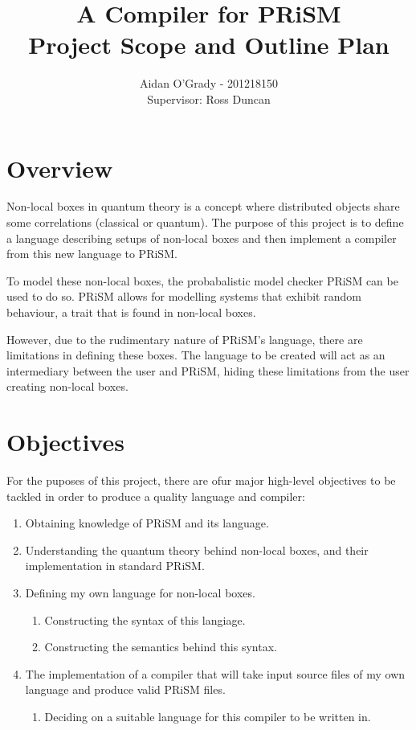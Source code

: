 \documentclass[12pt, a4paper]{article}
\begin{document}
\title{A Compiler for PRiSM \\
\large{Project Scope and Outline Plan}}
\author{Aidan O'Grady - 201218150\\{Supervisor: Ross Duncan}}
\date{}
\maketitle
\newpage

\section{Overview} %
\label{sec:overview}
Non-local boxes in quantum theory is a concept where distributed objects share
some correlations (classical or quantum). The purpose of this project is to
define a language describing setups of non-local boxes and then implement a
compiler from this new language to PRiSM.

To model these non-local boxes, the probabalistic model checker PRiSM can be
used to do so. PRiSM allows for modelling systems that exhibit random behaviour,
a trait that is found in non-local boxes.

However, due to the rudimentary nature of PRiSM's language, there are
limitations in defining these boxes. The language to be created will act as an
intermediary between the user and PRiSM, hiding these limitations from the user
creating non-local boxes.


\section{Objectives} %
\label{sec:objectives}
For the puposes of this project, there are ofur major high-level objectives to
be tackled in order to produce a quality language and compiler:
\begin{enumerate}
    \item Obtaining knowledge of PRiSM and its language.
    \item Understanding the quantum theory behind non-local boxes, and their
    implementation in standard PRiSM.
    \item Defining my own language for non-local boxes.
    \begin{enumerate}
        \item Constructing the syntax of this langiage.
        \item Constructing the semantics behind this syntax.
    \end{enumerate}
    \item The implementation of a compiler that will take input source files of
    my own language and produce valid PRiSM files.
    \begin{enumerate}
        \item Deciding on a suitable language for this compiler to be written
        in.
    \end{enumerate}
\end{enumerate}
\end{document}
